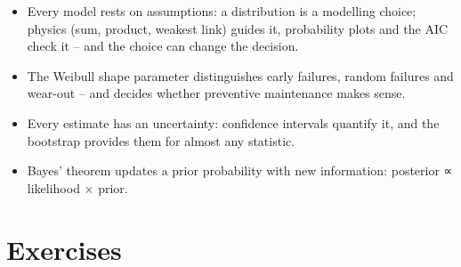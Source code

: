 \documentclass[
  letterpaper,
  DIV=11,
  numbers=noendperiod]{scrreprt}
\providecommand{\tightlist}{%
  \setlength{\itemsep}{0pt}\setlength{\parskip}{0pt}}\usepackage{longtable,booktabs,array}
\begin{document}
\begin{tcolorbox}[enhanced jigsaw, left=2mm, title=\textcolor{quarto-callout-important-color}{\faExclamation}\hspace{0.5em}{Key takeaways}, opacityback=0, breakable, rightrule=.15mm, arc=.35mm, toptitle=1mm, colbacktitle=quarto-callout-important-color!10!white, opacitybacktitle=0.6, coltitle=black, colframe=quarto-callout-important-color-frame, bottomrule=.15mm, leftrule=.75mm, bottomtitle=1mm, titlerule=0mm, toprule=.15mm, colback=white]

\begin{itemize}
\tightlist
\item
  Every model rests on assumptions: a distribution is a modelling
  choice; physics (sum, product, weakest link) guides it, probability
  plots and the AIC check it -- and the choice can change the decision.
\item
  The Weibull shape parameter distinguishes early failures, random
  failures and wear-out -- and decides whether preventive maintenance
  makes sense.
\item
  Every estimate has an uncertainty: confidence intervals quantify it,
  and the bootstrap provides them for almost any statistic.
\item
  Bayes' theorem updates a prior probability with new information:
  posterior ∝ likelihood × prior.
\end{itemize}

\end{tcolorbox}

\section{Exercises}\label{exercises-3}
\end{document}
